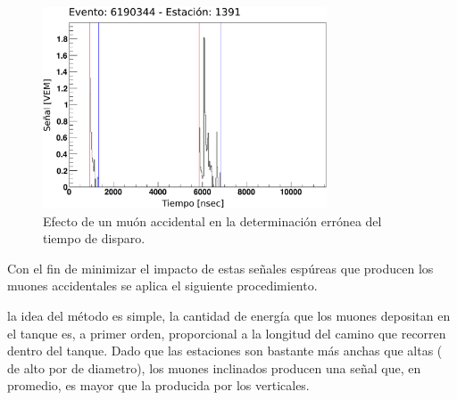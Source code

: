 		\begin{figure}[ht]
		\begin{center}
		\includegraphics[width=0.75\textwidth]{fig/seleccionAuger/badStartTime.pdf}
		\caption{Efecto de un muón accidental en la determinación errónea del tiempo de disparo.}
		\label{fig:trazaMalTiempo}
		\end{center}
		\end{figure}
		
		Con el fin de minimizar el impacto de estas señales espúreas que producen los muones accidentales se aplica el siguiente procedimiento.
		
		 la idea del método es simple, la cantidad de energía que los muones depositan en el tanque es, a primer orden, proporcional a la longitud del camino que recorren dentro del tanque.
		Dado que las estaciones son bastante más anchas que altas ( de alto por  de diametro), los muones inclinados producen una señal que, en promedio, es mayor que la producida por los verticales.
		

